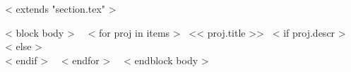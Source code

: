 ~< extends "section.tex" >~

~< block body >~
~< for proj in items >~
  << proj.title >>
  ~< if proj.descr >~
    {\color{gray}{<< proj.descr >>} \\}
  ~< else >~
    \\[2mm]
  ~< endif >~
~< endfor >~
\vspace{-3mm}
~< endblock body >~
